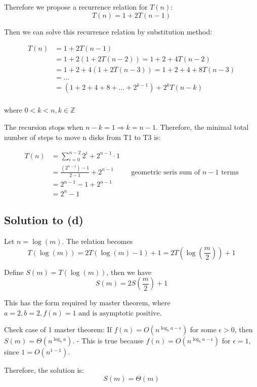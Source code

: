\documentclass{article}
\begin{document}
Therefore we propose a recurrence relation for \(T(n)\):
\[T(n) = 1 + 2T(n-1)\]

Then we can solve this recurrence relation by substitution method:

\begin{align*}
T(n) &= 1 + 2T(n-1) \\
&= 1 + 2(1 + 2T(n-2))  = 1 + 2 + 4T(n-2) \\
&= 1 + 2 + 4(1 + 2T(n-3)) = 1 + 2 + 4 + 8T(n-3) \\
&= \ldots \\
&= \left( 1 + 2 + 4 + 8 + \ldots + 2^{k-1} \right) + 2^{k} T(n-k) \\
\end{align*}

where \(0 < k < n, k \in \mathbb{Z}\) 

The recursion stops when \(n-k = 1 \Rightarrow k = n-1\). Therefore, the minimal total number of steps to move n disks from T1 to T3 is:

\begin{align*}
    T(n) &= \sum_{i=0}^{n-2} 2^i + 2^{n-1} \cdot  1 \\
    &= \frac{(2^{n-1})-1}{2-1} + 2^{n-1}  && \text{geometric seris sum of } n - 1 \text{ terms} \\
    &= 2^{n-1} - 1 + 2^{n-1}\\
    &= 2^n - 1
\end{align*}

\newpage

\subsection*{Solution to (d)}

Let \(n = \log(m)\). The relation becomes 
\[
T(\log(m)) = 2T(\log(m)-1) + 1 = 2T(\log(\frac{m}{2})) + 1
\]

Define \(S(m) = T(\log(m))\), then we have
\[S(m) = 2S(\frac{m}{2}) + 1\]

This has the form required by master theorem, where \(a = 2, b = 2, f(n) = 1 \text{ and is asymptotic positive}\).

\vspace{3mm}

Check case of 1 master theorem: If \(f(n) = O(n^{\log_b a - \epsilon})\) for some \(\epsilon > 0\), then \(S(m) = \Theta(n^{\log_b a})\).
- This is true because \(f(n) = O(n^{\log_b a - \epsilon})\) for \(\epsilon = 1\), since \(1 = O(n^{1-1})\).

Therefore, the solution is:
\[S(m) = \Theta(m)\]
\end{document}
